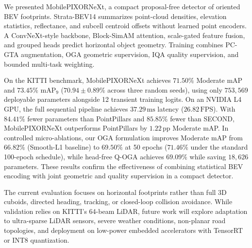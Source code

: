 We presented MobilePIXORNeXt, a compact proposal-free detector of oriented BEV footprints. Strata-BEV14 summarizes point-cloud densities, elevation statistics, reflectance, and subcell centroid offsets without learned point encoders. A ConvNeXt-style backbone, Block-SimAM attention, scale-gated feature fusion, and grouped heads predict horizontal object geometry. Training combines PC-GTA augmentation, OGA geometric supervision, IQA quality supervision, and bounded multi-task weighting.

On the KITTI benchmark, MobilePIXORNeXt achieves $71.50\%$ Moderate mAP and $73.45\%$ $\text{mAP}_9$ ($70.94 \pm 0.89\%$ across three random seeds), using only $753{,}569$ deployable parameters alongside 12 transient training logits. On an NVIDIA L4 GPU, the full sequential pipeline achieves $37.29\,\text{ms}$ latency ($26.82\,\text{FPS}$). With $84.41\%$ fewer parameters than PointPillars and $85.85\%$ fewer than SECOND, MobilePIXORNeXt outperforms PointPillars by $1.22\,\text{pp}$ Moderate mAP. In controlled micro-ablations, our OGA formulation improves Moderate mAP from $66.82\%$ (Smooth-L1 baseline) to $69.50\%$ at 50 epochs ($71.46\%$ under the standard 100-epoch schedule), while head-free Q-OGA achieves $69.09\%$ while saving $18{,}626$ parameters. These results confirm the effectiveness of combining statistical BEV encoding with joint geometric and quality supervision in a compact detector.

The current evaluation focuses on horizontal footprints rather than full 3D cuboids, directed heading, tracking, or closed-loop collision avoidance. While validation relies on KITTI's 64-beam LiDAR, future work will explore adaptation to ultra-sparse LiDAR sensors, severe weather conditions, non-planar road topologies, and deployment on low-power embedded accelerators with TensorRT or INT8 quantization.